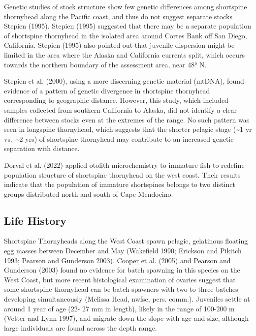 \documentclass[11pt,
  english,
  letterpaper,
]{article}
\begin{document}
Genetic studies of stock structure show few genetic differences among shortspine thornyhead along the Pacific coast, and thus do not suggest separate stocks Stepien (1995). Stepien (1995) suggested that there may be a separate population of shortspine thornyhead in the isolated area around Cortes Bank off San Diego, California. Stepien (1995) also pointed out that juvenile dispersion might be limited in the area where the Alaska and California currents split, which occurs towards the northern boundary of the assessment area, near 48° N.

Stepien et al. (2000), using a more discerning genetic material (mtDNA), found evidence of a pattern of genetic divergence in shortspine thornyhead corresponding to geographic distance. However, this study, which included samples collected from southern California to Alaska, did not identify a clear difference between stocks even at the extremes of the range. No such pattern was seen in longspine thornyhead, which suggests that the shorter pelagic stage (\textasciitilde1 yr vs.~\textasciitilde2 yrs) of shortspine thornyhead may contribute to an increased genetic separation with distance.

Dorval et al. (2022) applied otolith microchemistry to immature fish to redefine population structure of shortspine thornyhead on the west coast. Their results indicate that the population of immature shortspines belongs to two distinct groups distributed north and south of Cape Mendocino.

\hypertarget{life-history}{%
\subsection{Life History}\label{life-history}}

Shortspine Thornyheads along the West Coast spawn pelagic, gelatinous floating egg masses between December and May (Wakefield 1990; Erickson and Pikitch 1993; Pearson and Gunderson 2003). Cooper et al. (2005) and Pearson and Gunderson (2003) found no evidence for batch spawning in this species on the West Coast, but more recent histological examination of ovaries suggest that some shortspine thornyhead can be batch spawners with two to three batches developing simultaneously (Melissa Head, \gls{nwfsc}, pers. comm.). Juveniles settle at around 1 year of age (22- 27 mm in length), likely in the range of 100-200 m (Vetter and Lynn 1997), and migrate down the slope with age and size, although large individuals are found across the depth range.
\end{document}
